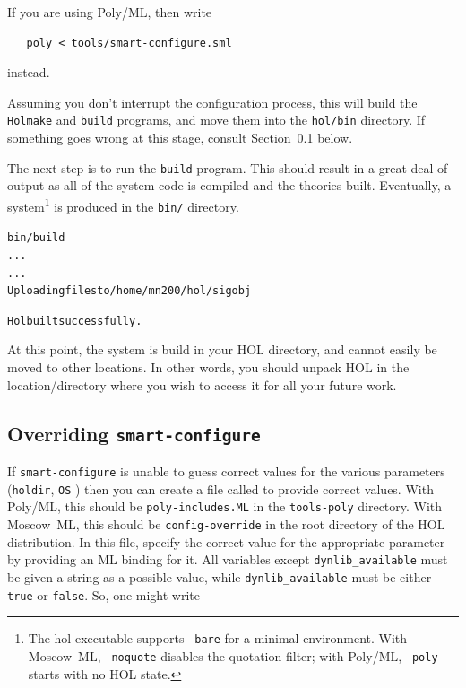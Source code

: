 If you are using Poly/ML, then write
\begin{verbatim}
   poly < tools/smart-configure.sml
\end{verbatim}
instead.

Assuming you don't interrupt the configuration process, this will
build the \texttt{Holmake} and \texttt{build} programs, and move them
into the \texttt{hol/bin} directory.  If something goes wrong at this
stage, consult Section~\ref{sec:editting-configure} below.

The next step is to run the \texttt{build} program.  This should
result in a great deal of output as all of the system code is compiled
and the theories built.  Eventually, a \HOL{} system\footnote{The
  \textsf{hol} executable supports \texttt{--bare} for a minimal environment.
  With Moscow~ML, \texttt{--noquote} disables the quotation filter;
  with Poly/ML, \texttt{--poly} starts with no HOL state.} is produced in
the \texttt{bin/} directory.

\begin{session}
\begin{alltt}
\dol bin/build
  ...
  ...
Uploading files to /home/mn200/hol/sigobj

Hol built successfully.
\dol
\end{alltt}
\end{session}

At this point, the system is build in your HOL directory, and cannot easily be moved to other locations.
In other words, you should unpack HOL in the location/directory where you wish to access it for all your future work.



\subsection{Overriding \texttt{smart-configure}}
\label{sec:editting-configure}

If \texttt{smart-configure} is unable to guess correct values for the various parameters (\texttt{holdir}, \texttt{OS} \etc) then you can create a file called to provide correct values.
With Poly/ML, this should be \texttt{poly-includes.ML} in the \texttt{tools-poly} directory.
With Moscow~ML, this should be \texttt{config-override} in the root directory of the HOL distribution.
In this file, specify the correct value for the appropriate parameter by providing an ML binding for it.
All variables except \texttt{dynlib\_available} must be given a string as a possible value, while \texttt{dynlib\_available} must be either \texttt{true} or \texttt{false}.
So, one might write

